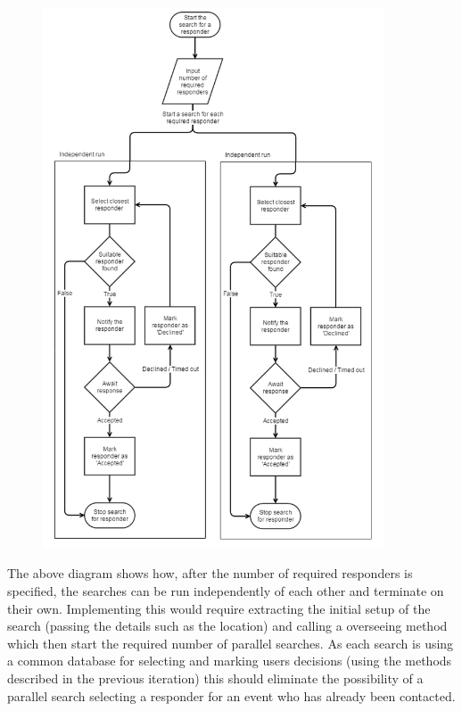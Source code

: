 \documentclass{article}
\begin{document}
\pagebreak
	\begin{figure}[H]
		\centering
		\vspace{-80pt}
		\includegraphics[width=0.9\textwidth]{"Iteration3/parallelization_of_search (2) (1)"}
	\end{figure}
The above diagram shows how, after the number of required responders is specified, the searches can be run independently of each other and terminate on their own.
Implementing this would require extracting the initial setup of the search (passing the details such as the location) and calling a overseeing method which then start the required number of parallel searches. As each search is using a common database for selecting and marking users decisions (using the methods described in the previous iteration) this should eliminate the possibility of a parallel search selecting a responder for an event who has already been contacted.\\
\end{document}
